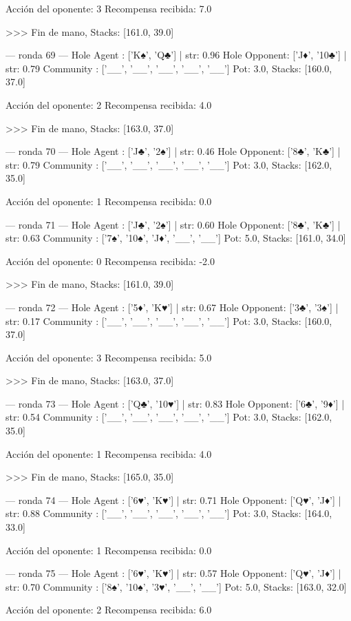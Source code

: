 Acción del oponente: 3
Recompensa recibida: 7.0

>>> Fin de mano, Stacks: [161.0, 39.0]


--- ronda 69 ---
Hole Agent : ['K♠', 'Q♣'] | str: 0.96
Hole Opponent: ['J♦', '10♣'] | str: 0.79
Community  : ['__', '__', '__', '__', '__']
Pot: 3.0, Stacks: [160.0, 37.0]

Acción del oponente: 2
Recompensa recibida: 4.0

>>> Fin de mano, Stacks: [163.0, 37.0]


--- ronda 70 ---
Hole Agent : ['J♣', '2♠'] | str: 0.46
Hole Opponent: ['8♣', 'K♣'] | str: 0.79
Community  : ['__', '__', '__', '__', '__']
Pot: 3.0, Stacks: [162.0, 35.0]

Acción del oponente: 1
Recompensa recibida: 0.0

--- ronda 71 ---
Hole Agent : ['J♣', '2♠'] | str: 0.60
Hole Opponent: ['8♣', 'K♣'] | str: 0.63
Community  : ['7♠', '10♠', 'J♦', '__', '__']
Pot: 5.0, Stacks: [161.0, 34.0]

Acción del oponente: 0
Recompensa recibida: -2.0

>>> Fin de mano, Stacks: [161.0, 39.0]


--- ronda 72 ---
Hole Agent : ['5♦', 'K♥'] | str: 0.67
Hole Opponent: ['3♣', '3♠'] | str: 0.17
Community  : ['__', '__', '__', '__', '__']
Pot: 3.0, Stacks: [160.0, 37.0]

Acción del oponente: 3
Recompensa recibida: 5.0

>>> Fin de mano, Stacks: [163.0, 37.0]


--- ronda 73 ---
Hole Agent : ['Q♣', '10♥'] | str: 0.83
Hole Opponent: ['6♣', '9♦'] | str: 0.54
Community  : ['__', '__', '__', '__', '__']
Pot: 3.0, Stacks: [162.0, 35.0]

Acción del oponente: 1
Recompensa recibida: 4.0

>>> Fin de mano, Stacks: [165.0, 35.0]


--- ronda 74 ---
Hole Agent : ['6♥', 'K♥'] | str: 0.71
Hole Opponent: ['Q♥', 'J♦'] | str: 0.88
Community  : ['__', '__', '__', '__', '__']
Pot: 3.0, Stacks: [164.0, 33.0]

Acción del oponente: 1
Recompensa recibida: 0.0

--- ronda 75 ---
Hole Agent : ['6♥', 'K♥'] | str: 0.57
Hole Opponent: ['Q♥', 'J♦'] | str: 0.70
Community  : ['8♠', '10♠', '3♥', '__', '__']
Pot: 5.0, Stacks: [163.0, 32.0]

Acción del oponente: 2
Recompensa recibida: 6.0

